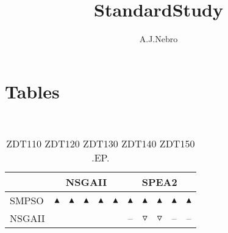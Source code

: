 \documentclass{article}
\title{StandardStudy}
\author{A.J.Nebro}
\begin{document}
\maketitle
\section{Tables}
\
\begin{table}
\caption{
ZDT110 ZDT120 ZDT130 ZDT140 ZDT150 
.EP.}
\label{Table:
ZDT110 ZDT120 ZDT130 ZDT140 ZDT150 
.EP.}
\centering
\begin{scriptsize}
\begin{tabular}{
| l | p{0.15cm }p{0.15cm }p{0.15cm }p{0.15cm }p{0.15cm } | p{0.15cm }p{0.15cm }p{0.15cm }p{0.15cm }p{0.15cm } | 
}
\hline \multicolumn{1}{|c|}{} & \multicolumn{5}{c|}{NSGAII} & \multicolumn{5}{c|}{SPEA2} \\
\hline 
SMPSO
 & 
$\blacktriangle$
&
$\blacktriangle$
&
$\blacktriangle$
&
$\blacktriangle$
&
$\blacktriangle$
 & 
$\blacktriangle$
&
$\blacktriangle$
&
$\blacktriangle$
&
$\blacktriangle$
&
$\blacktriangle$
 \\ 
NSGAII
 & 
  
&
  
&
  
&
  
&
  
 & 
--
&
$\triangledown$
&
$\triangledown$
&
--
&
--
 \\ 
\hline
\end{tabular}
\end{scriptsize}
\end{table}
\end{document}
